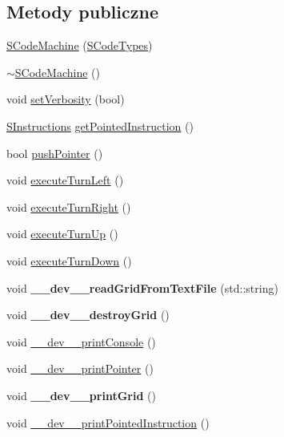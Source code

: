 \subsection*{Metody publiczne}
\begin{CompactItemize}
\item 
\hyperlink{classSCodeMachine_bb85f472be7c8e2112bbe5d6643f99b7}{SCodeMachine} (\hyperlink{senums_8h_1a2ae45552936d27425f99e1c187b043}{SCodeTypes})
\item 
\hyperlink{classSCodeMachine_67d39a3662fc2640aa506a581766a9b8}{$\sim$SCodeMachine} ()
\item 
void \hyperlink{classSCodeMachine_4a2d7edca4db9e3bd8942abc13f6c8ec}{setVerbosity} (bool)
\item 
\hyperlink{senums_8h_b1c3fa9dccd3f8afa81e14a98d9a7d1e}{SInstructions} \hyperlink{classSCodeMachine_3c851e80ec35cbebeb78ec8ceed8c5ca}{getPointedInstruction} ()
\item 
bool \hyperlink{classSCodeMachine_69a97f71f2a16f69f9daca1bf8433964}{pushPointer} ()
\item 
void \hyperlink{classSCodeMachine_d8415a221140a08a9383a595336cdf69}{executeTurnLeft} ()
\item 
void \hyperlink{classSCodeMachine_d48065e7bf42eef9e3a0f81fbb17f301}{executeTurnRight} ()
\item 
void \hyperlink{classSCodeMachine_f2867d02414db096844e4801f9895650}{executeTurnUp} ()
\item 
void \hyperlink{classSCodeMachine_26b7ba8981d08d594b0c37617aa85277}{executeTurnDown} ()
\item 
\hypertarget{classSCodeMachine_f83465e2ab7065c7b386a189d57ae9ab}{
void \textbf{\_\-\_\-dev\_\-\_\-readGridFromTextFile} (std::string)}
\label{classSCodeMachine_f83465e2ab7065c7b386a189d57ae9ab}

\item 
\hypertarget{classSCodeMachine_c9345e02c8383585cf1738c653f83cfd}{
void \textbf{\_\-\_\-dev\_\-\_\-destroyGrid} ()}
\label{classSCodeMachine_c9345e02c8383585cf1738c653f83cfd}

\item 
void \hyperlink{classSCodeMachine_29892f8f026e8dcd71ec99b9c593e022}{\_\-\_\-dev\_\-\_\-printConsole} ()
\item 
void \hyperlink{classSCodeMachine_b4c8492fda9fe21cc2620ede3630d852}{\_\-\_\-dev\_\-\_\-printPointer} ()
\item 
\hypertarget{classSCodeMachine_0ea93dafdabff0ff080a24b6c8ef9ea1}{
void \textbf{\_\-\_\-dev\_\-\_\-printGrid} ()}
\label{classSCodeMachine_0ea93dafdabff0ff080a24b6c8ef9ea1}

\item 
void \hyperlink{classSCodeMachine_6a725d341bffacccb53431f88c62b713}{\_\-\_\-dev\_\-\_\-printPointedInstruction} ()
\end{CompactItemize}


